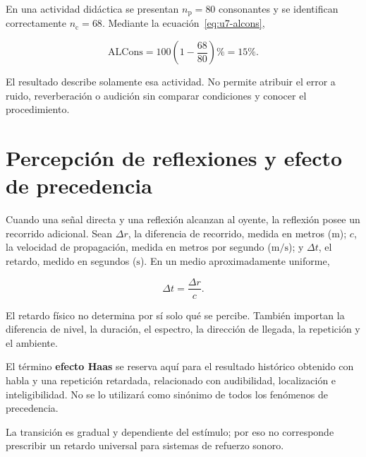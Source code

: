 En una actividad didáctica se presentan \(n_\mathrm{p}=80\) consonantes y se
identifican correctamente \(n_\mathrm{c}=68\). Mediante la
ecuación~\eqref{eq:u7-alcons},

\[
    \mathrm{ALCons}
      =100\left(1-\frac{68}{80}\right)\%
      =15\%.
\]

El resultado describe solamente esa actividad. No permite atribuir el error a
ruido, reverberación o audición sin comparar condiciones y conocer el
procedimiento.

\section{Percepción de reflexiones y efecto de precedencia}
\label{sec:u7-precedencia}

Cuando una señal directa y una reflexión alcanzan al oyente, la reflexión
posee un recorrido adicional. Sean \(\Delta r\), la diferencia de recorrido,
medida en metros (\(\text{m}\)); \(c\), la velocidad de propagación, medida en
metros por segundo (\(\text{m}/\text{s}\)); y \(\Delta t\), el retardo,
medido en segundos (\(\text{s}\)). En un medio aproximadamente uniforme,

\begin{equation}
    \Delta t=\frac{\Delta r}{c}.
    \label{eq:u7-retardo-reflexion}
\end{equation}

El retardo físico no determina por sí solo qué se percibe. También importan la
diferencia de nivel, la duración, el espectro, la dirección de llegada, la
repetición y el ambiente.


El término \textbf{efecto Haas} se reserva aquí para el resultado histórico
obtenido con habla y una repetición retardada, relacionado con audibilidad,
localización e inteligibilidad. No se lo utilizará como sinónimo de todos los
fenómenos de precedencia.

 La
transición es gradual y dependiente del estímulo; por eso no corresponde
prescribir un retardo universal para sistemas de refuerzo sonoro.

